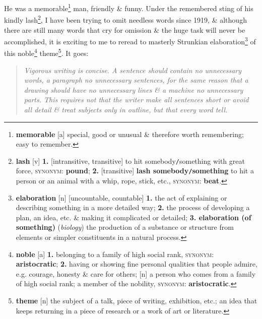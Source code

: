 \documentclass{article}
\begin{document}
He was a memorable\footnote{{\bf memorable} [a] special, good or unusual \& therefore worth remembering; easy to remember.} man, friendly \& funny. Under the remembered sting of his kindly lash\footnote{{\bf lash} [v] {\bf 1.} [intransitive, transitive] to hit somebody{\tt/}something with great force, \textsc{synonym}: {\bf pound}; {\bf 2.} [transitive] {\bf lash somebody{\tt/}something} to hit a person or an animal with a whip, rope, stick, etc., \textsc{synonym}: {\bf beat}.}, I have been trying to omit needless words since 1919, \& although there are still many words that cry for omission \& the huge task will never be accomplished, it is exciting to me to reread to masterly Strunkian elaboration\footnote{{\bf elaboration} [n] [uncountable, countable] {\bf 1.} the act of explaining or describing something in a more detailed way; {\bf 2.} the process of developing a plan, an idea, etc. \& making it complicated or detailed; {\bf 3. elaboration (of something)} ({\it biology}) the production of a substance or structure from elements or simpler constituents in a natural process.} of this noble\footnote{{\bf noble} [a] {\bf 1.} belonging to a family of high social rank, \textsc{synonym}: {\bf aristocratic}; {\bf 2.} having or showing fine personal qualities that people admire, e.g. courage, honesty \& care for others; [n] a person who comes from a family of high social rank; a member of the nobility, \textsc{synonym}: {\bf aristocratic}.} theme\footnote{{\bf theme} [n] the subject of a talk, piece of writing, exhibition, etc.; an idea that keeps returning in a piece of research or a work of art or literature.}. It goes:
\begin{quotation}
	{\it Vigorous writing is concise. A sentence should contain no unnecessary words, a paragraph no unnecessary sentences, for the same reason that a drawing should have no unnecessary lines \& a machine no unnecessary parts. This requires not that the writer make all sentences short or avoid all detail \& treat subjects only in outline, but that every word tell.}
\end{quotation}
\end{document}
